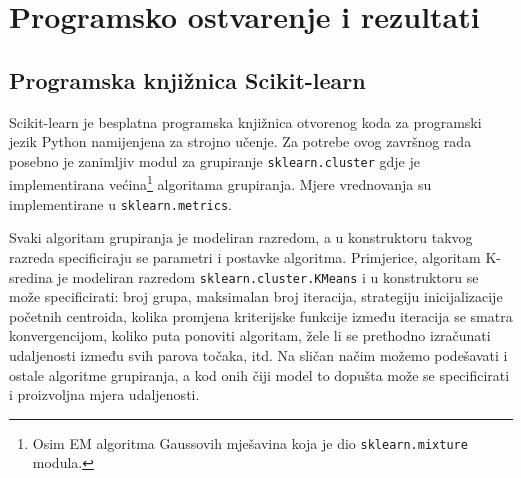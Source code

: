 \documentclass[times, utf8, zavrsni]{fer}
\begin{document}
\chapter{Programsko ostvarenje i rezultati}
\label{chap:results}

\section{Programska knjižnica Scikit-learn}
Scikit-learn je besplatna programska knjižnica otvorenog koda za programski jezik Python namijenjena za strojno učenje. Za potrebe ovog završnog rada posebno je zanimljiv modul za grupiranje \texttt{sklearn.cluster} gdje je implementirana većina\footnote{Osim EM algoritma Gaussovih mješavina koja je dio \texttt{sklearn.mixture} modula.} algoritama grupiranja. Mjere vrednovanja su implementirane u \texttt{sklearn.metrics}.

Svaki algoritam grupiranja je modeliran razredom, a u konstruktoru takvog razreda specificiraju se parametri i postavke algoritma. Primjerice, algoritam K-sredina je modeliran razredom \texttt{sklearn.cluster.KMeans} i u konstruktoru se može specificirati: broj grupa, maksimalan broj iteracija, strategiju inicijalizacije početnih centroida, kolika promjena kriterijske funkcije između iteracija se smatra konvergencijom, koliko puta ponoviti algoritam, žele li se prethodno izračunati udaljenosti između svih parova točaka, itd. Na sličan načim možemo podešavati i ostale algoritme grupiranja, a kod onih čiji model to dopušta može se specificirati i proizvoljna mjera udaljenosti.
\end{document}
